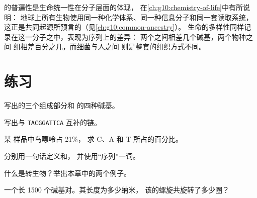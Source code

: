 \begin{remark}[分子水平上的统一性与多样性]\label{rem:g10:universal-dna:unity}
 的普遍性是生命统一性在分子层面的体现，
在\cref{ch:g10:chemistry-of-life}中有所说明：
地球上所有生物使用同一种化学体系、同一种信息分子和同一套读取系统，
这正是共同起源所预言的（见\cref{ch:g10:common-ancestry}）。
生命的多样性同样记录在这一分子之中，表现为序列上的差异：
两个之间相差几个碱基，两个物种之间
组相差百分之几，而细菌与人之间
则是整套的组织方式不同。
\end{remark}

\section{练习}

\begin{exercise}[$\star$]\label{exo:g10:universal-dna:1}
写出的三个组成部分和  的四种碱基。
\end{exercise}

\begin{exercise}[$\star$]\label{exo:g10:universal-dna:2}
写出与 \texttt{TACGGATTCA} 互补的链。
\end{exercise}

\begin{exercise}[$\star$]\label{exo:g10:universal-dna:3}
某  样品中鸟嘌呤占 21\%，
求 C、A 和 T 所占的百分比。
\end{exercise}

\begin{exercise}[$\star$]\label{exo:g10:universal-dna:4}
分别用一句话定义和，
并使用“序列”一词。
\end{exercise}

\begin{exercise}[$\star$]\label{exo:g10:universal-dna:5}
什么是转生物？举出本章中的两个例子。
\end{exercise}

\begin{exercise}[$\star\star$]\label{exo:g10:universal-dna:6}
一个长 1500 个碱基对。其长度为多少纳米，
该的螺旋共旋转了多少圈？
\end{exercise}

